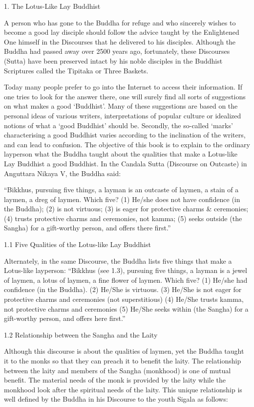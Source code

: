 1. The Lotus-Like Lay Buddhist

A person who has gone to the Buddha for refuge and who sincerely wishes to become a good lay disciple should follow the advice taught by the Enlightened One himself in the Discourses that he delivered to his disciples. Although the Buddha had passed away over 2500 years ago, fortunately, these Discourses (Sutta) have been preserved intact by his noble disciples in the Buddhist Scriptures called the Tipitaka or Three Baskets.

Today many people prefer to go into the Internet to access their information. If one tries to look for the answer there, one will surely find all sorts of suggestions on what makes a good ‘Buddhist’. Many of these suggestions are based on the personal ideas of various writers, interpretations of popular culture or idealized notions of what a ‘good Buddhist’ should be. Secondly, the so-called ‘marks’ characterising a good Buddhist varies according to the inclination of the writers, and can lead to confusion. The objective of this book is to explain to the ordinary layperson what the Buddha taught about the qualities that make a Lotus-like Lay Buddhist a good Buddhist. In the Candala Sutta (Discourse on Outcaste) in Anguttara Nikaya V, the Buddha said:

“Bikkhus, pursuing five things, a layman is an outcaste of laymen, a stain of a laymen, a dreg of laymen. Which five? (1) He/she does not have confidence (in the Buddha); (2) is not virtuous; (3) is eager for protective charms & ceremonies; (4) trusts protective charms and ceremonies, not kamma; (5) seeks outside (the Sangha) for a gift-worthy person, and offers there first.”

1.1 Five Qualities of the Lotus-like Lay Buddhist

Alternately, in the same Discourse, the Buddha lists five things that make a Lotus-like layperson: “Bikkhus (see 1.3), pursuing five things, a layman is a jewel of laymen, a lotus of laymen, a fine flower of laymen. Which five?
(1) He/she had confidence (in the Buddha).
(2) He/She is virtuous.
(3) He/She is not eager for protective charms and ceremonies (not superstitious)
(4) He/She trusts kamma, not protective charms and ceremonies
(5) He/She seeks within (the Sangha) for a gift-worthy person, and offers here first.”

1.2 Relationship between the Sangha and the Laity

Although this discourse is about the qualities of laymen, yet the Buddha taught it to the monks so that they can preach it to benefit the laity. The relationship between the laity and members of the Sangha (monkhood) is one of mutual benefit. The material needs of the monk is provided by the laity while the monkhood look after the spiritual needs of the laity. This unique relationship is well defined by the Buddha in his Discourse to the youth Sigala as follows:

